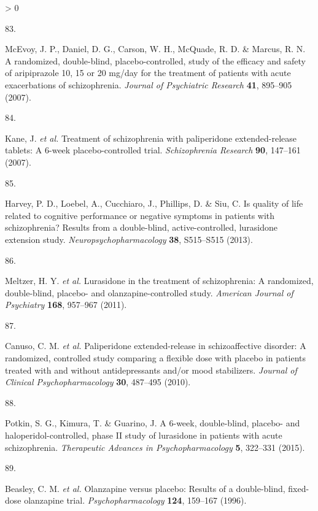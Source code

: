 \documentclass[
  9pt,
  english,
  ,jou,floatsintext]{apa6}
\newlength{\cslhangindent}
\newlength{\csllabelwidth}
\newenvironment{CSLReferences}[2] %
 {%
  \setlength{\parindent}{0pt}
  \ifodd #1 \everypar{\setlength{\hangindent}{\cslhangindent}}\ignorespaces\fi
  \ifnum #2 > 0
  \setlength{\parskip}{#2\baselineskip}
  \fi
 }%
 {}
\newcommand{\CSLLeftMargin}[1]{\parbox[t]{\csllabelwidth}{#1}}
\newcommand{\CSLRightInline}[1]{\parbox[t]{\linewidth - \csllabelwidth}{#1}\break}
\begin{document}
\begin{CSLReferences}{0}{0}
\leavevmode\hypertarget{ref-McEvoy2007}{}%
\CSLLeftMargin{83. }
\CSLRightInline{McEvoy, J. P., Daniel, D. G., Carson, W. H., McQuade, R. D. \& Marcus, R. N. A randomized, double-blind, placebo-controlled, study of the efficacy and safety of aripiprazole 10, 15 or 20 mg/day for the treatment of patients with acute exacerbations of schizophrenia. \emph{Journal of Psychiatric Research} \textbf{41}, 895--905 (2007).}

\leavevmode\hypertarget{ref-Kane2007}{}%
\CSLLeftMargin{84. }
\CSLRightInline{Kane, J. \emph{et al.} Treatment of schizophrenia with paliperidone extended-release tablets: A 6-week placebo-controlled trial. \emph{Schizophrenia Research} \textbf{90}, 147--161 (2007).}

\leavevmode\hypertarget{ref-Harvey2013}{}%
\CSLLeftMargin{85. }
\CSLRightInline{Harvey, P. D., Loebel, A., Cucchiaro, J., Phillips, D. \& Siu, C. Is quality of life related to cognitive performance or negative symptoms in patients with schizophrenia? Results from a double-blind, active-controlled, lurasidone extension study. \emph{Neuropsychopharmacology} \textbf{38}, S515--S515 (2013).}

\leavevmode\hypertarget{ref-Meltzer2011}{}%
\CSLLeftMargin{86. }
\CSLRightInline{Meltzer, H. Y. \emph{et al.} Lurasidone in the treatment of schizophrenia: A randomized, double-blind, placebo- and olanzapine-controlled study. \emph{American Journal of Psychiatry} \textbf{168}, 957--967 (2011).}

\leavevmode\hypertarget{ref-Canuso2010b}{}%
\CSLLeftMargin{87. }
\CSLRightInline{Canuso, C. M. \emph{et al.} Paliperidone extended-release in schizoaffective disorder: A randomized, controlled study comparing a flexible dose with placebo in patients treated with and without antidepressants and/or mood stabilizers. \emph{Journal of Clinical Psychopharmacology} \textbf{30}, 487--495 (2010).}

\leavevmode\hypertarget{ref-Potkin2015}{}%
\CSLLeftMargin{88. }
\CSLRightInline{Potkin, S. G., Kimura, T. \& Guarino, J. A 6-week, double-blind, placebo- and haloperidol-controlled, phase {II} study of lurasidone in patients with acute schizophrenia. \emph{Therapeutic Advances in Psychopharmacology} \textbf{5}, 322--331 (2015).}

\leavevmode\hypertarget{ref-Beasley1996a}{}%
\CSLLeftMargin{89. }
\CSLRightInline{Beasley, C. M. \emph{et al.} Olanzapine versus placebo: Results of a double-blind, fixed-dose olanzapine trial. \emph{Psychopharmacology} \textbf{124}, 159--167 (1996).}


\end{CSLReferences}
\end{document}
